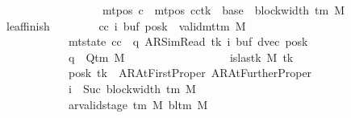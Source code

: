 \begin{isabellebody}
\ \ \ \ \ \ \ \ \ \ \ \ \ \ \ \ \ \ \ \ \ \ \ {\isasymand}\ mt{\isacharunderscore}{\kern0pt}pos\ c{\isacharprime}{\kern0pt}{\isacharprime}{\kern0pt}\ {\isacharequal}{\kern0pt}\ {\isacharparenleft}{\kern0pt}mt{\isacharunderscore}{\kern0pt}pos\ cc{\isacharparenright}{\kern0pt}{\isacharparenleft}{\kern0pt}tk\ {\isacharcolon}{\kern0pt}{\isacharequal}{\kern0pt}\ base\ {\isacharplus}{\kern0pt}\ {\isacharparenleft}{\kern0pt}block{\isacharunderscore}{\kern0pt}width\ {\isacharparenleft}{\kern0pt}{\isasymGamma}{\isacharunderscore}{\kern0pt}tm\ M{\isacharparenright}{\kern0pt}\ {\isacharminus}{\kern0pt}\ {}{\isacharparenright}{\kern0pt}{\isacharparenright}{\kern0pt}{\isachardoublequoteclose}\isanewline
\ \ \ \ \ \ \ leaf{\isacharunderscore}{\kern0pt}finish{\isacharcolon}{\kern0pt}\isanewline
\ \ \ \ \ \ \ \ {\isachardoublequoteopen}{\isasymAnd}cc\ i\ buf{\isacharprime}{\kern0pt}\ posk{\isacharprime}{\kern0pt}{\isachardot}{\kern0pt}\ {\isasymlbrakk}\ valid{\isacharunderscore}{\kern0pt}mttm\ M{\isacharsemicolon}{\kern0pt}\isanewline
\ \ \ \ \ \ \ \ \ \ \ \ \ \ \ \ \ \ mt{\isacharunderscore}{\kern0pt}state\ cc\ {\isacharequal}{\kern0pt}\ {\isacharparenleft}{\kern0pt}q{\isacharcomma}{\kern0pt}\ AR{\isacharunderscore}{\kern0pt}SimRead{\isacharcomma}{\kern0pt}\ tk{\isacharcomma}{\kern0pt}\ i{\isacharcomma}{\kern0pt}\ buf{\isacharprime}{\kern0pt}{\isacharcomma}{\kern0pt}\ dvec{\isacharcomma}{\kern0pt}\ posk{\isacharprime}{\kern0pt}{\isacharparenright}{\kern0pt}{\isacharsemicolon}{\kern0pt}\isanewline
\ \ \ \ \ \ \ \ \ \ \ \ \ \ \ \ \ \ q\ {\isasymin}\ Q{\isacharunderscore}{\kern0pt}tm\ M{\isacharsemicolon}{\kern0pt}\isanewline
\ \ \ \ \ \ \ \ \ \ \ \ \ \ \ \ \ \ is{\isacharunderscore}{\kern0pt}last{\isacharunderscore}{\kern0pt}k\ M\ tk{\isacharsemicolon}{\kern0pt}\isanewline
\ \ \ \ \ \ \ \ \ \ \ \ \ \ \ \ \ \ posk{\isacharprime}{\kern0pt}\ tk\ {\isasymin}\ {\isacharbraceleft}{\kern0pt}AR{\isacharunderscore}{\kern0pt}AtFirstProper{\isacharcomma}{\kern0pt}\ AR{\isacharunderscore}{\kern0pt}AtFurtherProper{\isacharbraceright}{\kern0pt}{\isacharsemicolon}{\kern0pt}\isanewline
\ \ \ \ \ \ \ \ \ \ \ \ \ \ \ \ \ \ i\ {\isacharequal}{\kern0pt}\ Suc\ {\isacharparenleft}{\kern0pt}block{\isacharunderscore}{\kern0pt}width\ {\isacharparenleft}{\kern0pt}{\isasymGamma}{\isacharunderscore}{\kern0pt}tm\ M{\isacharparenright}{\kern0pt}{\isacharparenright}{\kern0pt}{\isacharsemicolon}{\kern0pt}\isanewline
\ \ \ \ \ \ \ \ \ \ \ \ \ \ \ \ \ \ ar{\isacharunderscore}{\kern0pt}valid{\isacharunderscore}{\kern0pt}stage\ {\isacharparenleft}{\kern0pt}{\isasymGamma}{\isacharunderscore}{\kern0pt}tm\ M{\isacharparenright}{\kern0pt}\ {\isacharparenleft}{\kern0pt}bl{\isacharunderscore}{\kern0pt}tm\ M{\isacharparenright}{\kern0pt}\isanewline

\end{isabellebody}
